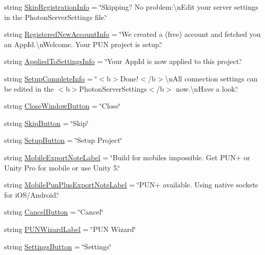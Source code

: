 \begin{DoxyCompactItemize}
\item 
string \hyperlink{class_pun_wizard_text_a973c1a00148edb46e50c5f3402773faf}{Skip\+Registration\+Info} = \char`\"{}Skipping? No problem\+:\textbackslash{}n\+Edit your server settings in the Photon\+Server\+Settings file.\char`\"{}
\item 
string \hyperlink{class_pun_wizard_text_a646ee360759be07d62f726e71e2b60cf}{Registered\+New\+Account\+Info} = \char`\"{}We created a (free) account and fetched you an App\+Id.\textbackslash{}n\+Welcome. Your P\+UN project is setup.\char`\"{}
\item 
string \hyperlink{class_pun_wizard_text_af582ba8445fcb5925fa47644b5454353}{Applied\+To\+Settings\+Info} = \char`\"{}Your App\+Id is now applied to this project.\char`\"{}
\item 
string \hyperlink{class_pun_wizard_text_a338b0f8e3a6ef07835774e3a78120d5e}{Setup\+Complete\+Info} = \char`\"{}$<$b$>$Done!$<$/b$>$\textbackslash{}n\+All connection settings can be edited in the $<$b$>$Photon\+Server\+Settings$<$/b$>$ now.\textbackslash{}n\+Have a look.\char`\"{}
\item 
string \hyperlink{class_pun_wizard_text_ac309bbb1df1a12df4f603ebf0f80de1b}{Close\+Window\+Button} = \char`\"{}Close\char`\"{}
\item 
string \hyperlink{class_pun_wizard_text_a503099b34e7df57344d72ab814de5931}{Skip\+Button} = \char`\"{}Skip\char`\"{}
\item 
string \hyperlink{class_pun_wizard_text_a8caffc5953e24d8a4895e4842873872d}{Setup\+Button} = \char`\"{}Setup Project\char`\"{}
\item 
string \hyperlink{class_pun_wizard_text_aebc740e552f294483c01928873c21226}{Mobile\+Export\+Note\+Label} = \char`\"{}Build for mobiles impossible. Get P\+UN+ or Unity Pro for mobile or use Unity 5.\char`\"{}
\item 
string \hyperlink{class_pun_wizard_text_a018209b0518c1a8ce5c5cc64848d8099}{Mobile\+Pun\+Plus\+Export\+Note\+Label} = \char`\"{}P\+UN+ available. Using native sockets for i\+OS/Android.\char`\"{}
\item 
string \hyperlink{class_pun_wizard_text_ad647358b4b8a0519d87fbdeb24a6d6e0}{Cancel\+Button} = \char`\"{}Cancel\char`\"{}
\item 
string \hyperlink{class_pun_wizard_text_aca0372a55e64a97efa52bf6d9cba5cd9}{P\+U\+N\+Wizard\+Label} = \char`\"{}P\+UN Wizard\char`\"{}
\item 
string \hyperlink{class_pun_wizard_text_a9e1177cd98a9d2882313a00f0e0af5d8}{Settings\+Button} = \char`\"{}Settings\char`\"{}

\end{DoxyCompactItemize}
